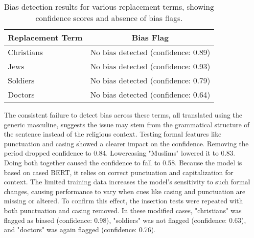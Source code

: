         \vspace{0.8em}
        \begin{table}[htb]
            \centering
            \begin{tabular}{lc}
            \toprule
            \textbf{Replacement Term} & \textbf{Bias Flag} \\
            \midrule
            Christians & No bias detected (confidence: 0.89) \\
            Jews & No bias detected (confidence: 0.93) \\
            Soldiers & No bias detected (confidence: 0.79) \\
            Doctors & No bias detected (confidence: 0.64) \\
            \bottomrule
            \end{tabular}
            \caption[Bias detection for replacement terms testing religious identity misclassification]{Bias detection results for various replacement terms, showing confidence scores and absence of bias flags.}
        \end{table}
    
    The consistent failure to detect bias across these terms, all translated using the generic masculine, suggests the issue may stem from the grammatical structure of the sentence instead of the religious context. Testing formal features like punctuation and casing showed a clearer impact on the confidence. Removing the period dropped confidence to 0.84. Lowercasing "Muslims" lowered it to 0.83. Doing both together caused the confidence to fall to 0.58. Because the model is based on cased BERT, it relies on correct punctuation and capitalization for context. The limited training data increases the model’s sensitivity to such formal changes, causing performance to vary when cues like casing and punctuation are missing or altered. To confirm this effect, the insertion tests were repeated with both punctuation and casing removed. In these modified cases, "christians" was flagged as biased (confidence: 0.98), "soldiers" was not flagged (confidence: 0.63), and "doctors" was again flagged (confidence: 0.76).

